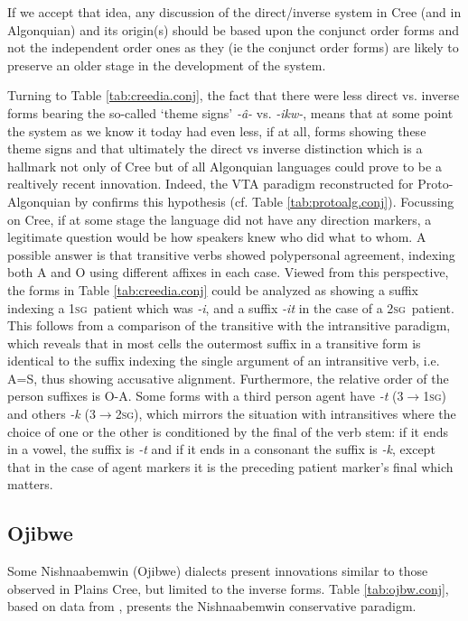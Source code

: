 \documentclass[twoside,a4paper,11pt]{article}
\newcommand{\sg}{\textsc{sg}}
\newcommand{\Σ}{\greek{Σ}}
\begin{document}
If we accept that idea, any discussion of the direct/inverse system in Cree (and in Algonquian) and its origin(s) should be based upon the conjunct order forms and not the independent order ones as they (ie the conjunct order forms) are likely to preserve an older stage in the development of the system.

Turning to Table \vref{tab:creedia.conj}, the fact that there were less direct vs. inverse forms bearing the so-called `theme signs' \textit{-â-} vs. \textit{-ikw-}, means that at some point the system as we know it today had even less, if at all, forms showing these theme signs and that ultimately the direct vs inverse distinction which is a hallmark not only of Cree but of all Algonquian languages could prove to be a realtively recent innovation. Indeed, the VTA paradigm reconstructed for Proto-Algonquian by \cite{goddard00cheyenne} confirms this hypothesis (cf. Table \vref{tab:protoalg.conj}). Focussing on Cree, if at some stage the language did not have any direction markers, a legitimate question would be how speakers knew who did what to whom. A possible answer is that transitive verbs showed polypersonal agreement, indexing both A and O using different affixes in each case. Viewed from this perspective, the forms in Table \vref{tab:creedia.conj} could be analyzed as showing a suffix indexing a 1\sg\ patient which was \textit{-i}, and a suffix \textit{-it} in the case of a 2\sg\ patient. This follows from a comparison of the transitive with the intransitive paradigm, which reveals that in most cells the outermost suffix in a transitive form is identical to the suffix indexing the single argument of an intransitive verb, i.e. A=S, thus showing accusative alignment. Furthermore, the relative order of the person suffixes is O-A. Some forms with a third person agent have \textit{-t} (3$\rightarrow$1\sg) and others \textit{-k} (3$\rightarrow$2\sg), which mirrors the situation with intransitives where the choice of one or the other is conditioned by the final of the verb stem: if it ends in a vowel, the suffix is \textit{-t} and if it ends in a consonant the suffix is \textit{-k}, except that in the case of agent markers it is the preceding patient marker's final which matters. 


\subsection{Ojibwe}
Some Nishnaabemwin (Ojibwe) dialects  present innovations similar to those observed in Plains Cree, but limited to the inverse forms. Table \ref{tab:ojbw.conj}, based on data from \citet[295]{valentine01grammar}, presents the Nishnaabemwin conservative paradigm. 
\end{document}
